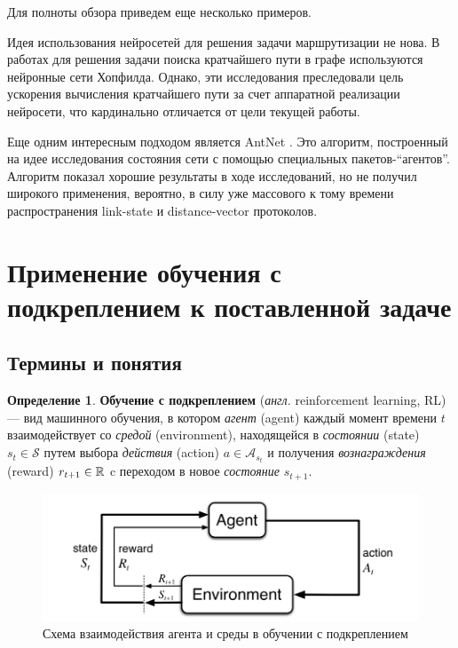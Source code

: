 \documentclass[specification,annotation,times]{itmo-student-thesis}
\theoremstyle{definition}
\newtheorem{definition-ru}{Определение}
\begin{document}
Для полноты обзора приведем еще несколько примеров.

Идея использования нейросетей для решения задачи маршрутизации не нова. В
работах \cite{ali-nn-routing, araujo2001neural} для решения задачи поиска кратчайшего пути в графе
используются нейронные сети Хопфилда. Однако, эти исследования преследовали цель
ускорения вычисления кратчайшего пути за счет аппаратной реализации нейросети,
что кардинально отличается от цели текущей работы.

Еще одним интересным подходом является AntNet \cite{di1998antnet}. Это алгоритм,
построенный на идее исследования состояния сети с помощью специальных
пакетов-\enquote{агентов}. Алгоритм показал хорошие результаты в ходе исследований, но
не получил широкого применения, вероятно, в силу уже массового к тому времени
распространения link-state и distance-vector протоколов.

\section{Применение обучения с подкреплением к поставленной задаче}

\subsection{Термины и понятия}

\begin{definition-ru}
  \textbf{Обучение с подкреплением} (\textit{англ.} reinforcement learning, RL) --- вид машинного
  обучения, в котором \textit{агент} (agent) каждый момент времени $t$ 
  взаимодействует со \textit{средой} (environment), находящейся в
  \textit{состоянии} (state) $s_t \in \mathcal{S}$ путем выбора
  \textit{действия} (action) $a \in \mathcal{A}_{s_t}$ и получения
  \textit{вознаграждения} (reward) $r_{t+1} \in \Bbb{R}$ c переходом в новое
  \textit{состояние} $s_{t+1}$.
\end{definition-ru}

\begin{figure}[!h]
  \caption{Схема взаимодействия агента и среды в обучении с подкреплением}\label{rl-scheme}
  \centering
  \includegraphics[scale=0.5]{rl-scheme}
\end{figure}
\end{document}

